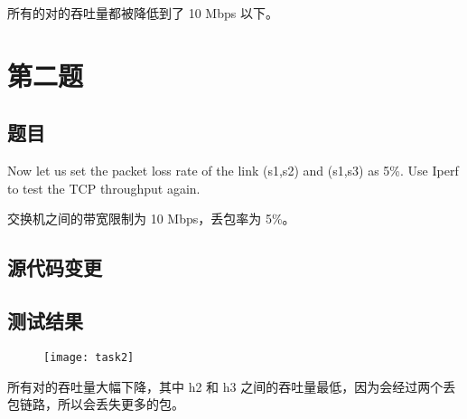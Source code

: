 所有的对的吞吐量都被降低到了 10 Mbps 以下。

\section{第二题}

\subsection{题目}

Now let us set the packet loss rate of the link (s1,s2) and (s1,s3) as 5\%. Use Iperf to test the TCP throughput again.

\begin{figure}[h]
    \centering
    
\end{figure}

交换机之间的带宽限制为 10 Mbps，丢包率为 5\%。

\subsection{源代码变更}


\subsection{测试结果}

\begin{figure}[h]
    \centering
    \begin{multicols}{2}
    \texttt{[image: task2]}

    \end{multicols}
\end{figure}

所有对的吞吐量大幅下降，其中 h2 和 h3 之间的吞吐量最低，因为会经过两个丢包链路，所以会丢失更多的包。

